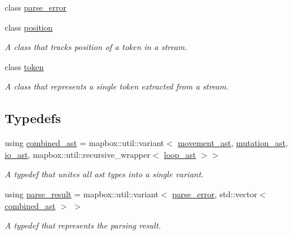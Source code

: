 \begin{DoxyCompactItemize}
class \hyperlink{classbfjit_1_1parse__error}{parse\+\_\+error}
\item 
class \hyperlink{classbfjit_1_1position}{position}
\begin{DoxyCompactList}\small\item\em A class that tracks position of a token in a stream. \end{DoxyCompactList}\item 
class \hyperlink{classbfjit_1_1token}{token}
\begin{DoxyCompactList}\small\item\em A class that represents a single token extracted from a stream. \end{DoxyCompactList}\end{DoxyCompactItemize}
\subsection*{Typedefs}
\begin{DoxyCompactItemize}
\item 
\hypertarget{namespacebfjit_ad9bbdb76861e57928b1bc7695c2c0623}{}\label{namespacebfjit_ad9bbdb76861e57928b1bc7695c2c0623} 
using \hyperlink{namespacebfjit_ad9bbdb76861e57928b1bc7695c2c0623}{combined\+\_\+ast} = mapbox\+::util\+::variant$<$ \hyperlink{classbfjit_1_1movement__ast}{movement\+\_\+ast}, \hyperlink{classbfjit_1_1mutation__ast}{mutation\+\_\+ast}, \hyperlink{classbfjit_1_1io__ast}{io\+\_\+ast}, mapbox\+::util\+::recursive\+\_\+wrapper$<$ \hyperlink{classbfjit_1_1loop__ast}{loop\+\_\+ast} $>$$>$
\begin{DoxyCompactList}\small\item\em A typedef that unites all ast types into a single variant. \end{DoxyCompactList}\item 
using \hyperlink{namespacebfjit_ac770ef0753b4d7d6bd5800262ba97f25}{parse\+\_\+result} = mapbox\+::util\+::variant$<$ \hyperlink{classbfjit_1_1parse__error}{parse\+\_\+error}, std\+::vector$<$ \hyperlink{namespacebfjit_ad9bbdb76861e57928b1bc7695c2c0623}{combined\+\_\+ast} $>$ $>$
\begin{DoxyCompactList}\small\item\em A typedef that represents the parsing result. \end{DoxyCompactList}\end{DoxyCompactItemize}
